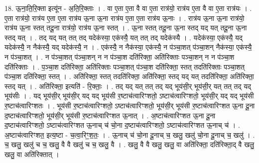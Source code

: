 \documentclass[17pt]{extarticle}
\begin{document}
18. ऊ॒ना॒ति॒रि॒क्ता इत्यू॑न - अ॒ति॒रि॒क्ताः । . वा ए॒ता ए॒ता वै वा ए॒ता रात्र॑यो॒ रात्र॑य ए॒ता वै वा ए॒ता रात्र॑यः । . ए॒ता रात्र॑यो॒ रात्र॑य ए॒ता ए॒ता रात्र॑य ऊ॒ना ऊ॒ना रात्र॑य ए॒ता ए॒ता रात्र॑य ऊ॒नाः । . रात्र॑य ऊ॒ना ऊ॒ना रात्र॑यो॒ रात्र॑य ऊ॒ना स्तत् तदू॒ना रात्र॑यो॒ रात्र॑य ऊ॒ना स्तत् । . ऊ॒ना स्तत् तदू॒ना ऊ॒ना स्तद् यद् यत् तदू॒ना ऊ॒ना स्तद् यत् । . तद् यद् यत् तत् तद् यदेक॑स्या॒ एक॑स्यै॒ यत् तत् तद् यदेक॑स्यै । . यदेक॑स्या॒ एक॑स्यै॒ यद् यदेक॑स्यै॒ न नैक॑स्यै॒ यद् यदेक॑स्यै॒ न । . एक॑स्यै॒ न नैक॑स्या॒ एक॑स्यै॒ न प॑ञ्चा॒शत् प॑ञ्चा॒शन् नैक॑स्या॒ एक॑स्यै॒ न प॑ञ्चा॒शत् । . न प॑ञ्चा॒शत् प॑ञ्चा॒शन् न न प॑ञ्चा॒श दति॑रिक्ता॒ अति॑रिक्ताः पञ्चा॒शन् न न प॑ञ्चा॒श दति॑रिक्ताः । . प॒ञ्चा॒श दति॑रिक्ता॒ अति॑रिक्ताः पञ्चा॒शत् प॑ञ्चा॒श दति॑रिक्ता॒ स्तत् तदति॑रिक्ताः पञ्चा॒शत् प॑ञ्चा॒श दति॑रिक्ता॒ स्तत् । . अति॑रिक्ता॒ स्तत् तदति॑रिक्ता॒ अति॑रिक्ता॒ स्तद् यद् यत् तदति॑रिक्ता॒ अति॑रिक्ता॒ स्तद् यत् । . अति॑रिक्ता॒ इत्यति॑ - रि॒क्ताः॒ । . तद् यद् यत् तत् तद् यद् भूय॑सी॒र् भूय॑सी॒र् यत् तत् तद् यद् भूय॑सीः । . यद् भूय॑सी॒र् भूय॑सी॒र् यद् यद् भूय॑सी र॒ष्टाच॑त्वारिꣳशतो॒ ऽष्टाच॑त्वारिꣳशतो॒ भूय॑सी॒र् यद् यद् भूय॑सी र॒ष्टाच॑त्वारिꣳशतः । . भूय॑सी र॒ष्टाच॑त्वारिꣳशतो॒ ऽष्टाच॑त्वारिꣳशतो॒ भूय॑सी॒र् भूय॑सी र॒ष्टाच॑त्वारिꣳशत ऊ॒ना दू॒ना द॒ष्टाच॑त्वारिꣳशतो॒ भूय॑सी॒र् भूय॑सी र॒ष्टाच॑त्वारिꣳशत ऊ॒नात् । . अ॒ष्टाच॑त्वारिꣳशत ऊ॒ना दू॒ना द॒ष्टाच॑त्वारिꣳशतो॒ ऽष्टाच॑त्वारिꣳशत ऊ॒नाच् च॑ चो॒ना द॒ष्टाच॑त्वारिꣳशतो॒ ऽष्टाच॑त्वारिꣳशत ऊ॒नाच् च॑ । . अ॒ष्टाच॑त्वारिꣳशत॒ इत्य॒ष्टा - च॒त्वा॒रिꣳ॒॒श॒तः॒ । . ऊ॒नाच् च॑ चो॒ना दू॒नाच् च॒ खलु॒ खलु॑ चो॒ना दू॒नाच् च॒ खलु॑ । . च॒ खलु॒ खलु॑ च च॒ खलु॒ वै वै खलु॑ च च॒ खलु॒ वै । . खलु॒ वै वै खलु॒ खलु॒ वा अति॑रिक्ता॒ दति॑रिक्ता॒द् वै खलु॒ खलु॒ वा अति॑रिक्तात् । \newline
\end{document}
